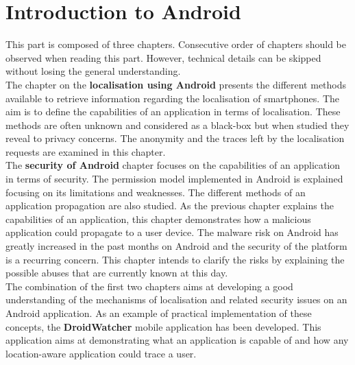 \chapter{Introduction to Android}
\label{chap:andro-intro}


This part is composed of three chapters.
Consecutive order of chapters should be observed when reading this part.
However, technical details can be skipped without losing the general understanding.\\

The chapter on the \textbf{localisation using Android} presents the different methods available to retrieve information regarding the localisation of smartphones.
The aim is to define the capabilities of an application in terms of localisation.
These methods are often unknown and considered as a black-box but when studied they reveal to privacy concerns.
The anonymity and the traces left by the localisation requests are examined in this chapter.\\

The \textbf{security of Android} chapter focuses on the capabilities of an application in terms of security.
The permission model implemented in Android is explained focusing on its limitations and weaknesses.
The different methods of an application propagation are also studied.
As the previous chapter explains the capabilities of an application, this chapter demonstrates how a malicious application could propagate to a user device.
The malware risk on Android has greatly increased in the past months on Android and the security of the platform is a recurring concern.
This chapter intends to clarify the risks by explaining the possible abuses that are currently known at this day.\\

The combination of the first two chapters aims at developing a good understanding of the mechanisms of localisation and related security issues on an Android application.
As an example of practical implementation of these concepts, the \textbf{DroidWatcher} mobile application has been developed.
This application aims at demonstrating what an application is capable of and how any location-aware application could trace a user.

